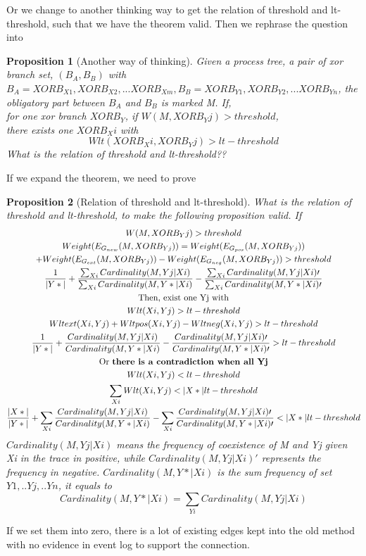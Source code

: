 \documentclass[]{article}
\newtheorem{myproposition}{Proposition}[section]
\begin{document}
Or we change to another thinking way to get the relation of threshold and lt-threshold, such that we have the theorem valid. Then we rephrase the question into
\begin{myproposition}[Another way of thinking]
	Given a process tree, a pair of xor branch set, $(B_A,B_B)$ with $B_A={XORB_{X1}, XORB_{X2},...XORB_{Xm}}, B_B={XORB_{Y1}, XORB_{Y2},...XORB_{Yn}}$, the obligatory part between $B_A$ and $B_B$ is marked M. If,\\
	for one xor branch $XORB_Y$, if $W(M, XORB_Yj) > threshold$, \\ there exists one $XORB_Xi$ with 
	\[Wlt(XORB_Xi, XORB_Yj)> lt-threshold\]
	What is the relation of threshold and lt-threshold?? 
\end{myproposition}
If we expand the theorem, we need to prove 
\begin{myproposition}[Relation of threshold and lt-threshold]
	What is the relation of threshold and lt-threshold, to make the following proposition valid. If 
	\begin{equation*}
	 \begin{gathered}
		W(M, XORB_Yj)  > threshold \\
	Weight(E_{G_{new}}(M, XORB_{Yj})) = Weight(E_{G_{pos}}(M, XORB_{Yj})) \\
	+ Weight(E_{G_{ext}}(M, XORB_{Yj})) 
	- Weight(E_{G_{neg}}(M, XORB_{Yj}))  > threshold \\
	\frac{1}{|Y*|} + \frac{\sum_{Xi}{Cardinality(M,Yj|Xi)}} {\sum_{Xi}{Cardinality(M,Y*|Xi)}}  
	- \frac{\sum_{Xi}{Cardinality(M,Yj|Xi)\prime}} {\sum_{Xi}{Cardinality(M,Y*|Xi)\prime}} \\
	\text{Then, exist one Yj with}\\
	Wlt(Xi, Yj)> lt-threshold \\
	Wlt{ext}(Xi, Yj) + Wlt{pos}(Xi, Yj) -Wlt{neg}(Xi, Yj) > lt-threshold\\
	\frac{1}{|Y*|} + \frac{Cardinality(M,Yj|Xi)} {Cardinality(M,Y*|Xi)}  
	- \frac{Cardinality(M,Yj|Xi)\prime} {Cardinality(M,Y*|Xi)\prime} > lt-threshold  \\
	\text{Or \textbf{there is a contradiction when all Yj}}\\
	Wlt(Xi, Yj)< lt-threshold\\
	\sum_{Xi} Wlt(Xi, Yj) < |X*|lt-threshold \\
	\frac{|X*|}{|Y*|} + \sum_{Xi}\frac{Cardinality(M,Yj|Xi)} {Cardinality(M,Y*|Xi)}  
	- \sum_{Xi}\frac{Cardinality(M,Yj|Xi)\prime} {Cardinality(M,Y*|Xi)\prime} < |X*|lt-threshold  \\
	 \end{gathered}
	\end{equation*}	
$Cardinality(M,Yj|Xi)$ means the frequency of coexistence of M and Yj given Xi in the trace in positive, while $Cardinality(M,Yj|Xi)\prime$ represents the frequency in negative. $Cardinality(M,Y*|Xi)$ is the sum frequency of set ${Y1,..Yj,..Yn}$, it equals to \[Cardinality(M,Y*|Xi) = \sum_{Yi}Cardinality(M,Yj|Xi)\]
\end{myproposition}
If we set them into zero, there is a lot of existing edges kept into the old method with no evidence in event log to support the connection. 
\end{document}
